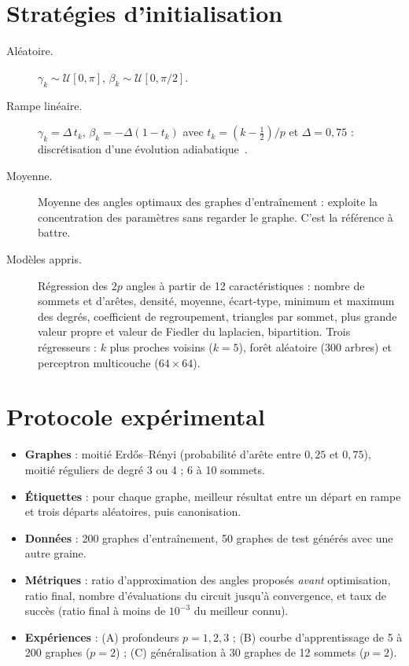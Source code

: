 \documentclass[11pt,a4paper]{article}
\begin{document}
\section{Stratégies d'initialisation}

\begin{description}
  \item[Aléatoire.] $\gamma_k \sim \mathcal{U}[0,\pi]$, $\beta_k \sim \mathcal{U}[0,\pi/2]$.
  \item[Rampe linéaire.] $\gamma_k = \Delta\, t_k$, $\beta_k = -\Delta(1-t_k)$ avec
        $t_k=(k-\frac12)/p$ et $\Delta=0{,}75$ : discrétisation d'une évolution adiabatique~\cite{zhou2020}.
  \item[Moyenne.] Moyenne des angles optimaux des graphes d'entraînement : exploite la
        concentration des paramètres sans regarder le graphe. C'est la référence à battre.
  \item[Modèles appris.] Régression des $2p$ angles à partir de 12 caractéristiques : nombre de
        sommets et d'arêtes, densité, moyenne, écart-type, minimum et maximum des degrés,
        coefficient de regroupement, triangles par sommet, plus grande valeur propre et valeur de
        Fiedler du laplacien, bipartition. Trois régresseurs : $k$ plus proches voisins ($k=5$),
        forêt aléatoire (300 arbres) et perceptron multicouche ($64\times64$).
\end{description}

\section{Protocole expérimental}

\begin{itemize}
  \item \textbf{Graphes} : moitié Erdős--Rényi (probabilité d'arête entre $0{,}25$ et $0{,}75$),
        moitié réguliers de degré 3 ou 4 ; 6 à 10 sommets.
  \item \textbf{Étiquettes} : pour chaque graphe, meilleur résultat entre un départ en rampe et
        trois départs aléatoires, puis canonisation.
  \item \textbf{Données} : 200 graphes d'entraînement, 50 graphes de test générés avec une autre graine.
  \item \textbf{Métriques} : ratio d'approximation des angles proposés \emph{avant} optimisation,
        ratio final, nombre d'évaluations du circuit jusqu'à convergence, et taux de succès (ratio
        final à moins de $10^{-3}$ du meilleur connu).
  \item \textbf{Expériences} : (A) profondeurs $p = 1, 2, 3$ ; (B) courbe d'apprentissage de 5 à
        200 graphes ($p=2$) ; (C) généralisation à 30 graphes de 12 sommets ($p=2$).
\end{itemize}
\end{document}
